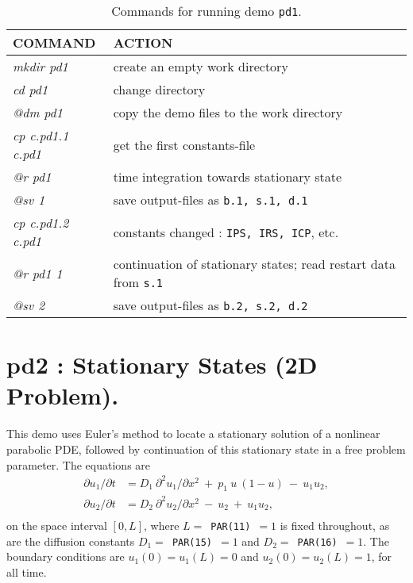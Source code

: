 \documentclass[12pt]{report}
\begin{document}
\begin{table}[htbp]
\begin{center}
\begin{tabular}{| l | l |}
\hline
  COMMAND  & ACTION \\
\hline
  {\it mkdir pd1} & create an empty work directory \\ 
  {\it cd pd1} & change directory \\
  {\it @dm pd1} & copy the demo files to the work directory \\
\hline
  {\it cp c.pd1.1 c.pd1} & get the first constants-file \\ 
  {\it @r pd1} & time integration towards stationary state \\ 
  {\it @sv 1} & save output-files as {\tt b.1, s.1, d.1} \\ 
\hline
  {\it cp c.pd1.2 c.pd1} & constants changed : {\tt IPS, IRS, ICP}, etc.  \\ 
  {\it @r pd1 1} & continuation of stationary states; read restart data from {\tt s.1} \\ 
  {\it @sv 2} & save output-files as {\tt b.2, s.2, d.2} \\ 
\hline
\end{tabular}
\caption{Commands for running demo {\tt pd1}.}
\label{tbl:demo_pd1}
\end{center}
\end{table}

\newpage
\section{ pd2 : Stationary States (2D Problem).} \label{sec:Demos_pd2}
This demo uses Euler's method to locate a stationary solution of
a nonlinear parabolic PDE, followed by continuation of this stationary
state in a free problem parameter. The equations are
\begin{equation} \begin{array}{cl}
  {\partial u_1 / \partial t} &= D_1~{\partial^2 u_1 / \partial x^2}
  ~+~  p_1~ u ~( 1-u) ~-~ u_1 u_2 , \\
  {\partial u_2 / \partial t} 
  &= D_2~{\partial^2 u_2 / \partial x^2} ~-~ u_2 ~+~ u_1 u_2 , \\
\end{array} \end{equation}
on the space interval $[0,L]$, where $L=$~{\tt PAR(11)}~$=1$ is fixed throughout,
as are the diffusion constants $D_1=$~{\tt PAR(15)}~$=1$ and $D_2=$~{\tt PAR(16)}~$=1$.
The boundary conditions are $u_1(0) = u_1(L) = 0$ and $u_2(0) = u_2(L) = 1$,
for all time.
\end{document}

